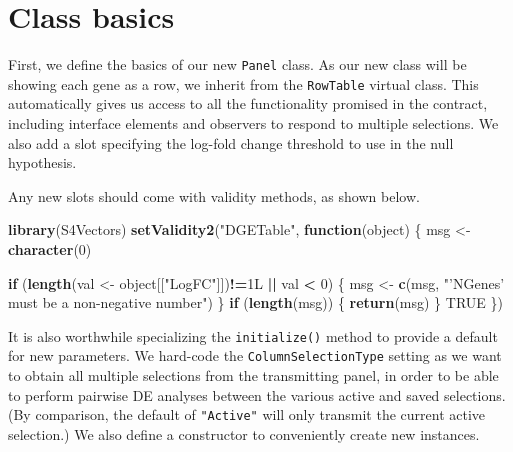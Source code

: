 \documentclass[
]{book}
\newenvironment{Shaded}{\begin{snugshade}}{\end{snugshade}}
\newcommand{\ControlFlowTok}[1]{\textcolor[rgb]{0.13,0.29,0.53}{\textbf{#1}}}
\newcommand{\DecValTok}[1]{\textcolor[rgb]{0.00,0.00,0.81}{#1}}
\newcommand{\KeywordTok}[1]{\textcolor[rgb]{0.13,0.29,0.53}{\textbf{#1}}}
\newcommand{\NormalTok}[1]{#1}
\newcommand{\OperatorTok}[1]{\textcolor[rgb]{0.81,0.36,0.00}{\textbf{#1}}}
\newcommand{\OtherTok}[1]{\textcolor[rgb]{0.56,0.35,0.01}{#1}}
\newcommand{\StringTok}[1]{\textcolor[rgb]{0.31,0.60,0.02}{#1}}
\begin{document}
\hypertarget{class-basics}{%
\section{Class basics}\label{class-basics}}

First, we define the basics of our new \texttt{Panel} class.
As our new class will be showing each gene as a row, we inherit from the \texttt{RowTable} virtual class.
This automatically gives us access to all the functionality promised in the contract,
including interface elements and observers to respond to multiple selections.
We also add a slot specifying the log-fold change threshold to use in the null hypothesis.

Any new slots should come with validity methods, as shown below.

\begin{Shaded}
\begin{Highlighting}[]
\KeywordTok{library}\NormalTok{(S4Vectors)}
\KeywordTok{setValidity2}\NormalTok{(}\StringTok{"DGETable"}\NormalTok{, }\ControlFlowTok{function}\NormalTok{(object) \{}
\NormalTok{    msg <-}\StringTok{ }\KeywordTok{character}\NormalTok{(}\DecValTok{0}\NormalTok{)}

    \ControlFlowTok{if}\NormalTok{ (}\KeywordTok{length}\NormalTok{(val <-}\StringTok{ }\NormalTok{object[[}\StringTok{"LogFC"}\NormalTok{]])}\OperatorTok{!=}\NormalTok{1L }\OperatorTok{||}\StringTok{ }\NormalTok{val }\OperatorTok{<}\StringTok{ }\DecValTok{0}\NormalTok{) \{}
\NormalTok{        msg <-}\StringTok{ }\KeywordTok{c}\NormalTok{(msg, }\StringTok{"'NGenes' must be a non-negative number"}\NormalTok{)}
\NormalTok{    \}}
    \ControlFlowTok{if}\NormalTok{ (}\KeywordTok{length}\NormalTok{(msg)) \{}
        \KeywordTok{return}\NormalTok{(msg)}
\NormalTok{    \}}
    \OtherTok{TRUE}
\NormalTok{\})}
\end{Highlighting}
\end{Shaded}

It is also worthwhile specializing the \texttt{initialize()} method to provide a default for new parameters.
We hard-code the \texttt{ColumnSelectionType} setting as we want to obtain all multiple selections from the transmitting panel,
in order to be able to perform pairwise DE analyses between the various active and saved selections.
(By comparison, the default of \texttt{"Active"} will only transmit the current active selection.)
We also define a constructor to conveniently create new instances.
\end{document}
